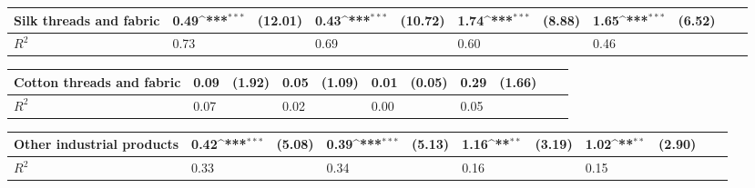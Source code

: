 \def\sym#1{\ifmmode^{#1}\else\(^{#1}\)\fi}
\begin{tabular}{p{4cm} p{1.4cm} p{1.2cm} p{1.5cm}  p{1.5cm} p{1.4cm} p{1.2cm} p{1.5cm} p{1.5cm}  p{1.5cm} p{1.5cm} }
\hline
Silk threads and fabric&     0.49\sym{***}&  (12.01)&     0.43\sym{***}&  (10.72)&     1.74\sym{***}&   (8.88)&     1.65\sym{***}&   (6.52)\\
\hline
\(R^{2}\)       &     0.73         &         &     0.69         &         &     0.60         &         &     0.46         &         \\
\end{tabular}
\def\sym#1{\ifmmode^{#1}\else\(^{#1}\)\fi}
\begin{tabular}{p{4cm} p{1.4cm} p{1.2cm} p{1.5cm}  p{1.5cm} p{1.4cm} p{1.2cm} p{1.5cm} p{1.5cm}  p{1.5cm} p{1.5cm} }
\hline
Cotton threads and fabric&     0.09         &   (1.92)&     0.05         &   (1.09)&     0.01         &   (0.05)&     0.29         &   (1.66)\\
\hline
\(R^{2}\)       &     0.07         &         &     0.02         &         &     0.00         &         &     0.05         &         \\
\end{tabular}
\def\sym#1{\ifmmode^{#1}\else\(^{#1}\)\fi}
\begin{tabular}{p{4cm} p{1.4cm} p{1.2cm} p{1.5cm}  p{1.5cm} p{1.4cm} p{1.2cm} p{1.5cm} p{1.5cm}  p{1.5cm} p{1.5cm} }
\hline
Other industrial products&     0.42\sym{***}&   (5.08)&     0.39\sym{***}&   (5.13)&     1.16\sym{**} &   (3.19)&     1.02\sym{**} &   (2.90)\\
\hline
\(R^{2}\)       &     0.33         &         &     0.34         &         &     0.16         &         &     0.15         &         \\
\end{tabular}
